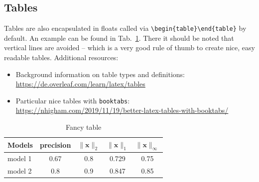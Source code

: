 \documentclass[journal]{IEEEtran}
\begin{document}
\subsection{Tables}
Tables are also encapsulated in floats called via  \verb!\begin{table}\end{table}! by default. An example can be found in Tab.~\ref{tab:fancy_Table}. There it should be noted that vertical lines are avoided -- which is a very good rule of thumb to create nice, easy readable tables. Additional resources:
\begin{itemize}
    \item Background information on table types and definitions: \url{https://de.overleaf.com/learn/latex/tables} 
    \item Particular nice tables with \verb!booktabs!: \url{https://nhigham.com/2019/11/19/better-latex-tables-with-booktabs/}
\end{itemize}

\begin{table}[htb] %
    \centering
    \caption{Fancy table}
    \begin{tabular}{lcccc} %
        \toprule
        Models & precision & $\|\bm{x}\|_2$ & $\|\bm{x}\|_1$  & $\|\bm{x}\|_\infty$ \\
        \midrule
        model 1 & 0.67  & 0.8 & 0.729  & 0.75 \\
        model 2 & 0.8 & 0.9 & 0.847 & 0.85 \\
        \bottomrule
    \end{tabular}
    \label{tab:fancy_Table}
\end{table}
\end{document}
